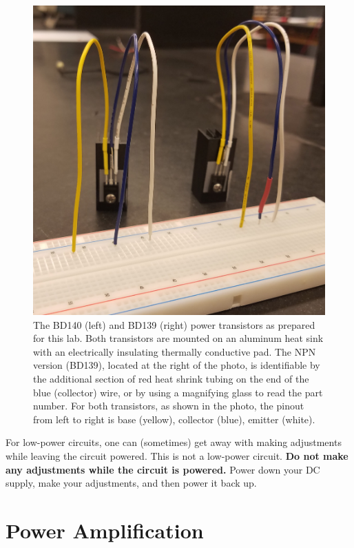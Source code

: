 \documentclass[12pt]{article}
\begin{document}
\begin{figure}[htbp]
\begin{center}
\includegraphics[height=0.35\textheight]{figs/bd139140_photo.jpg} 
\end{center}
\caption{The BD140 (left) and BD139 (right) power transistors as prepared for this lab.  Both transistors are mounted on an aluminum heat sink with an electrically insulating thermally conductive pad.  The NPN version (BD139), located at the right of the photo, is identifiable by the additional section of red heat shrink tubing on the end of the blue (collector) wire, or by using a magnifying glass to read the part number.  For both transistors, as shown in the photo, the pinout from left to right is base (yellow), collector (blue), emitter (white).}
\label{fig:bdphoto}
\end{figure}

For low-power circuits, one can (sometimes) get away with making adjustments while leaving the circuit powered.  This is not a low-power circuit.  {\bf Do not make any adjustments while the circuit is powered.}  Power down your DC supply, make your adjustments, and then power it back up.

\section{Power Amplification}
\end{document}
